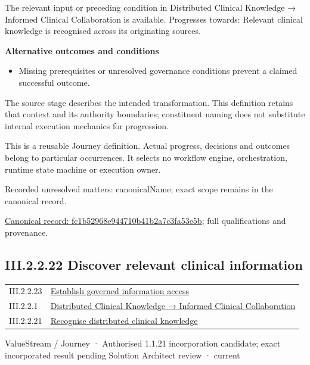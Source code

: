 The relevant input or preceding condition in Distributed Clinical Knowledge → Informed Clinical Collaboration is available. Progresses towards: Relevant clinical knowledge is recognised across its originating sources.



\par\medskip\textbf{Alternative outcomes and conditions}\par


\begin{itemize}


\item Missing prerequisites or unresolved governance conditions prevent a claimed successful outcome.

\end{itemize}


The source stage describes the intended transformation. This definition retains that context and its authority boundaries; constituent naming does not substitute internal execution mechanics for progression.



This is a reusable Journey definition. Actual progress, decisions and outcomes belong to particular occurrences. It selects no workflow engine, orchestration, runtime state machine or execution owner.


{\small Recorded unresolved matters: canonicalName; exact scope remains in the canonical record.}\par
{\footnotesize \href{../../../../../../../continuum/strategy/value-stream/fc1b52968e944710b41b2a7c3fa53e5b.md}{Canonical record: fc1b52968e944710b41b2a7c3fa53e5b}; full qualifications and provenance.}\par
\subsection*{III.2.2.22 Discover relevant clinical information}
\label{navigation:III.2.2.22}

\begin{longtable}{p{.22\linewidth}p{.73\linewidth}}
III.2.2.23 & \hyperref[element:26719186d6444b5b80029fbf13ae7d06]{Establish governed information access} \\
III.2.2.1 & \hyperref[element:3ba98c0c1170458f8c02fa76694fee67]{Distributed Clinical Knowledge → Informed Clinical Collaboration} \\
III.2.2.21 & \hyperref[element:fc1b52968e944710b41b2a7c3fa53e5b]{Recognise distributed clinical knowledge} \\
\end{longtable}
\label{element:413213f085b44715a309f39b55ee3ee6}
{\small ValueStream / Journey · Authorised 1.1.21 incorporation candidate; exact incorporated result pending Solution Architect review · current}\par

